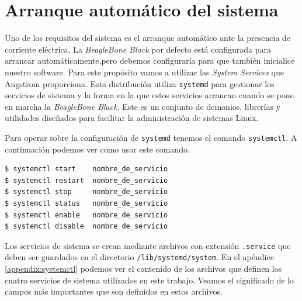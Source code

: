 \section{Arranque automático del sistema}
	Uno de los requisitos del sistema es el arranque automático ante la presencia de corriente eléctrica. La \emph{BeagleBone Black} por defecto está
	configurada para arrancar automáticamente,pero debemos configurarla para que también inicialice nuestro software. Para este propósito vamos a
	utilizar las \emph{System Services}\cite{AngSystemctl} que Angstrom proporciona. Esta distribución utiliza \texttt{systemd}\cite{systemdWiki}
	para gestionar los servicios de sistema y la forma en la que estos servicios arrancan cuando se pone en marcha la \emph{BeagleBone Black}. Este es un
	conjunto de demonios, librerías y utilidades diseñados para facilitar la administración de sistemas Linux.
	\par
	Para operar sobre la configuración de \texttt{systemd} tenemos el comando \texttt{systemctl}. A continuación podemos ver como usar este
	comando.
	\begin{lstlisting}[style=myBash]
$ systemctl start    nombre_de_servicio
$ systemctl restart  nombre_de_servicio
$ systemctl stop     nombre_de_servicio
$ systemctl status   nombre_de_servicio
$ systemctl enable   nombre_de_servicio
$ systemctl disable  nombre_de_servicio
	\end{lstlisting}
	\par
	Los servicios de sistema se crean mediante archivos con extensión \texttt{.service} que deben ser guardados en el directorio
	\texttt{/lib/systemd/system}. En el apéndice \ref{appendix:systemctl} podemos ver el contenido de los archivos que definen los cuatro
	servicios de sistema utilizados en este trabajo. Veamos el significado de lo campos más importantes que son definidos en estos archivos.
